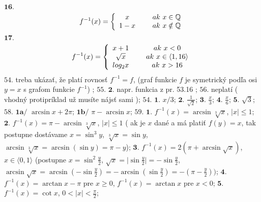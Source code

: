 $\boldsymbol{16.}$
\begin{align*}
f^{-1}(x)= \left\{ \begin{array}{cc} 
                x & \hspace{5mm} ak\ x  \in  \mathbb{Q} \\
                 1-x & \hspace{5mm} ak\ x \notin  \mathbb{Q}  \\
                \end{array} \right.
\end{align*}
$\boldsymbol{17.}$
\begin{align*}
f^{-1}(x)= \left\{ \begin{array}{cc} 
                x +1& \hspace{5mm} ak\ x < 0 \\
                  \sqrt{x}& \hspace{5mm} ak\ x \in  \langle1,16\rangle  \\
                  log _{2} x& \hspace{5mm} ak\ x> 16 
                \end{array} \right.
\end{align*}
$\boxed{54.}$ 
treba ukázať, že platí rovnosť $ f^{-1}=f $, (graf funkcie $ f $ je symetrický podľa osi $ y = x $ s grafom funkcie  $ f^{-1} $) ;
$\boxed{55.}$ 
$\boldsymbol{2.}$
napr. funkcia z pr. 53.16 ;
$\boxed{56.}$
neplatí ( vhodný protipríklad už musíte nájsť sami );
$\boxed{54.}$
$\boldsymbol{1.}$
$ x/3 $;
$\boldsymbol{2.}$
$  \frac{1}{\sqrt{2}} $;
$\boldsymbol{3.}$
$  \frac{x}{3} $;
$\boldsymbol{4.}$
$  \frac{x}{6} $;
$\boldsymbol{5.}$
$  \sqrt{3} $;
$\boxed{58.}$
$\boldsymbol{1a/}$
$ \arcsin x+2 \pi $;
$\boldsymbol{1b/}$
$  \pi - \arcsin x $;
$\boxed{59.}$
$\boldsymbol{1.}$
$ f^{-1}(x)= \arcsin \sqrt[3]{x} $, $ \vert x \vert \leq1 $;
$\boldsymbol{2.}$
$ f^{-1}(x)= \pi - \arcsin \sqrt[3]{x} $, $ \vert x \vert \leq1 $ ( ak je $ x $ dané a má platiť $ f(y)=x $, tak postupne dostávame $ x = \sin^{3} y $, $  \sqrt[3]{x } = \sin y $, $ \arcsin \sqrt[3]{x} = \arcsin (\sin y) = \pi -y $);
$\boldsymbol{3.}$
$ f^{-1}(x)= 2( \pi + \arcsin \sqrt{x}) $, $  x \in \langle0,1\rangle $  (postupne $ x = \sin ^{2} \frac{y}{2} $, $ \sqrt{x}= \vert \sin \frac{y}{2}\vert = - \sin \frac{y}{2} $, $ \arcsin \sqrt{x}= \arcsin (- \sin \frac{y}{2})= - \arcsin ( \sin \frac{y}{2}) = - ( \pi - \frac{y}{2}))$;
$\boldsymbol{4.}$
$ f^{-1}(x)= \arctan x- \pi $ pre $ x\geq 0 $, $ f^{-1} (x)= \arctan x$ pre $ x<0 $;
$\boldsymbol{5.}$
$f^{-1}(x)= \cot x $, $0<\vert x \vert < \frac{ \pi}{2}$;
